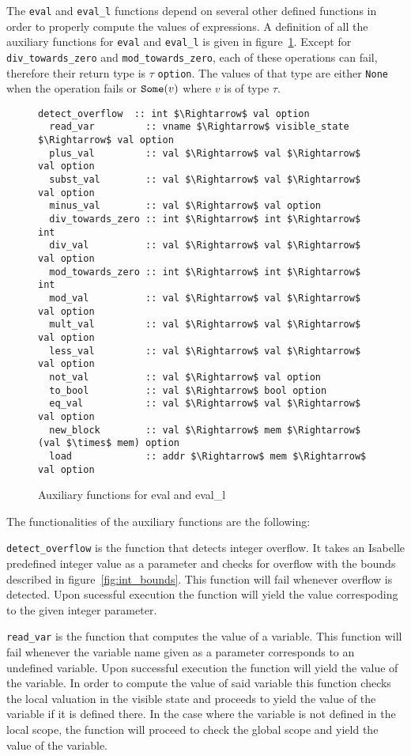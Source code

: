 The \verb|eval| and \verb|eval_l| functions depend on several other defined functions in order to properly compute the values of expressions.
A definition of all the auxiliary functions for \verb|eval| and \verb|eval_l| is given in figure~\ref{fig:aux_fun_eval}.
Except for \verb|div_towards_zero| and \verb|mod_towards_zero|, each of these operations can fail, therefore their return type is $\tau$ \verb|option|.
The values of that type are either \verb|None| when the operation fails or $\verb|Some|(v)$ where $v$ is of type $\tau$.

\begin{figure}
  \begin{lstlisting}[mathescape=true, frame=single]
  detect_overflow  :: int $\Rightarrow$ val option
  read_var         :: vname $\Rightarrow$ visible_state $\Rightarrow$ val option
  plus_val         :: val $\Rightarrow$ val $\Rightarrow$ val option
  subst_val        :: val $\Rightarrow$ val $\Rightarrow$ val option
  minus_val        :: val $\Rightarrow$ val option
  div_towards_zero :: int $\Rightarrow$ int $\Rightarrow$ int
  div_val          :: val $\Rightarrow$ val $\Rightarrow$ val option
  mod_towards_zero :: int $\Rightarrow$ int $\Rightarrow$ int
  mod_val          :: val $\Rightarrow$ val $\Rightarrow$ val option
  mult_val         :: val $\Rightarrow$ val $\Rightarrow$ val option
  less_val         :: val $\Rightarrow$ val $\Rightarrow$ val option
  not_val          :: val $\Rightarrow$ val option
  to_bool          :: val $\Rightarrow$ bool option
  eq_val           :: val $\Rightarrow$ val $\Rightarrow$ val option
  new_block        :: val $\Rightarrow$ mem $\Rightarrow$ (val $\times$ mem) option
  load             :: addr $\Rightarrow$ mem $\Rightarrow$ val option
  \end{lstlisting}

  \caption{Auxiliary functions for eval and eval\_l}
  \label{fig:aux_fun_eval}
\end{figure}

The functionalities of the auxiliary functions are the following:

\verb|detect_overflow| is the function that detects integer overflow.
It takes an Isabelle predefined integer value as a parameter and checks for overflow with the bounds described in figure~\ref{fig:int_bounds}.
This function will fail whenever overflow is detected.
Upon sucessful execution the function will yield the value correspoding to the given integer parameter.

\verb|read_var| is the function that computes the value of a variable.
This function will fail whenever the variable name given as a parameter corresponds to an undefined variable.
Upon successful execution the function will yield the value of the variable.
In order to compute the value of said variable this function checks the local valuation in the visible state and proceeds to yield the value of the variable if it is defined there.
In the case where the variable is not defined in the local scope, the function will proceed to check the global scope and yield the value of the variable.


